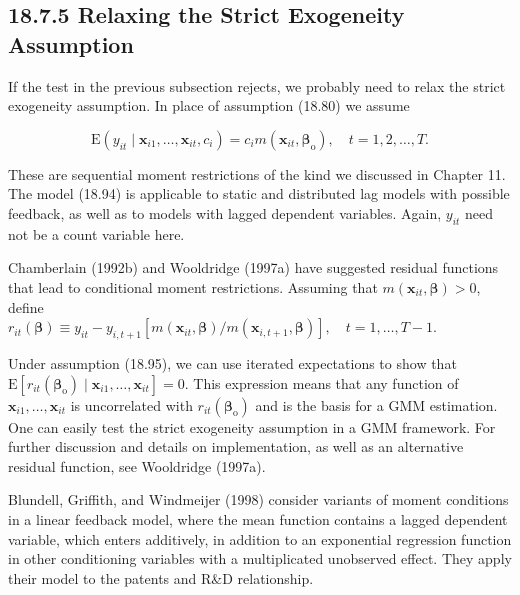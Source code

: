 \documentclass[10pt]{article}
\begin{document}
\subsection*{18.7.5 Relaxing the Strict Exogeneity Assumption}
If the test in the previous subsection rejects, we probably need to relax the strict exogeneity assumption. In place of assumption (18.80) we assume


\begin{equation*}
\mathrm{E}\left(y_{i t} \mid \mathbf{x}_{i 1}, \ldots, \mathbf{x}_{i t}, c_{i}\right)=c_{i} m\left(\mathbf{x}_{i t}, \boldsymbol{\beta}_{\mathrm{o}}\right), \quad t=1,2, \ldots, T . \tag{18.94}
\end{equation*}


These are sequential moment restrictions of the kind we discussed in Chapter 11. The model (18.94) is applicable to static and distributed lag models with possible feedback, as well as to models with lagged dependent variables. Again, $y_{i t}$ need not be a count variable here.

Chamberlain (1992b) and Wooldridge (1997a) have suggested residual functions that lead to conditional moment restrictions. Assuming that $m\left(\mathbf{x}_{i t}, \boldsymbol{\beta}\right)>0$, define\\
$r_{i t}(\boldsymbol{\beta}) \equiv y_{i t}-y_{i, t+1}\left[m\left(\mathbf{x}_{i t}, \boldsymbol{\beta}\right) / m\left(\mathbf{x}_{i, t+1}, \boldsymbol{\beta}\right)\right], \quad t=1, \ldots, T-1$.

Under assumption (18.95), we can use iterated expectations to show that $\mathrm{E}\left[r_{i t}\left(\boldsymbol{\beta}_{\mathrm{o}}\right) \mid \mathbf{x}_{i 1}, \ldots, \mathbf{x}_{i t}\right]=0$. This expression means that any function of $\mathbf{x}_{i 1}, \ldots, \mathbf{x}_{i t}$ is uncorrelated with $r_{i t}\left(\boldsymbol{\beta}_{\mathrm{o}}\right)$ and is the basis for a GMM estimation. One can easily test the strict exogeneity assumption in a GMM framework. For further discussion and details on implementation, as well as an alternative residual function, see Wooldridge (1997a).

Blundell, Griffith, and Windmeijer (1998) consider variants of moment conditions in a linear feedback model, where the mean function contains a lagged dependent variable, which enters additively, in addition to an exponential regression function in other conditioning variables with a multiplicated unobserved effect. They apply their model to the patents and R\&D relationship.
\end{document}
